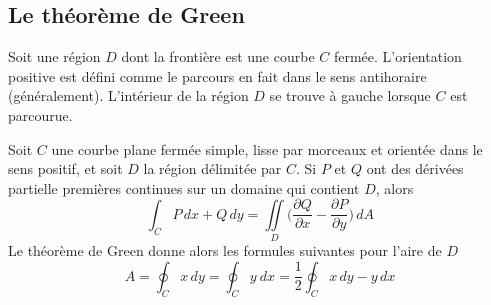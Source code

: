 	\subsection{Le théorème de Green}
		\begin{mydef}
			Soit une région $D$ dont la frontière est une courbe $C$ fermée. L'orientation positive est défini comme le parcours en fait dans le sens antihoraire (généralement). L'intérieur de la région $D$ se trouve à gauche lorsque $C$ est parcourue.
		\end{mydef}
		\begin{mythm}
			Soit $C$ une courbe plane fermée simple, lisse par morceaux et orientée dans le sens positif, et soit $D$ la région délimitée par $C$. Si $P$ et $Q$ ont des dérivées partielle premières continues sur un domaine qui contient $D$, alors \[\int_C P\,dx + Q\, dy = \iint\limits_D\Big(\frac{\partial Q}{\partial x}-\frac{\partial P}{\partial y}\Big)\, dA\]
			Le théorème de Green donne alors les formules suivantes pour l'aire de $D$
			\[A=\oint_C x\, dy=\oint_C y\ dx=\frac{1}{2}\oint_C x\, dy -y \, dx\]
		\end{mythm}
		